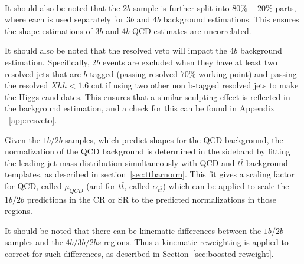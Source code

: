 \label{par:boosted-qcd-2bseperate}
\paragraph{} It should also be noted that the $2b$ sample is further split into $80\%-20\%$ parts, where each is used separately for 3$b$ and 4$b$ background estimations. This ensures the shape estimations of 3$b$ and 4$b$ QCD estimates are uncorrelated. 

It should also be noted that the resolved veto will impact the 4$b$ background estimation.  Specifically, 2$b$ events are excluded when they have at least two resolved jets that are $b$ tagged (passing resolved $70\%$ working point) and passing the resolved $Xhh < 1.6$ cut if using two other non b-tagged resolved jets to make the Higgs candidates. This ensures that a similar sculpting effect is reflected in the background estimation, and a check for this can be found in Appendix ~\ref{app:resveto}.

Given the $1b/2b$ samples, which predict shapes for the QCD background, the normalization of the QCD background is determined in the sideband by fitting the leading jet mass distribution simultaneously with QCD and $t\bar{t}$ background templates, as described in section~\ref{sec:ttbarnorm}.  This fit gives a scaling factor for QCD, called $\mu_{QCD}$ (and for $t\bar{t}$, called $\alpha_{t\bar{t}}$) which can be applied to scale the $1b/2b$ predictions in the CR or SR to the predicted normalizations in those regions.

It should be noted that there can be kinematic differences between the  $1b/2b$ samples and the $4b/3b/2bs$ regions.  Thus a kinematic reweighting is applied to correct for such differences, as described in Section~\ref{sec:boosted-reweight}.






